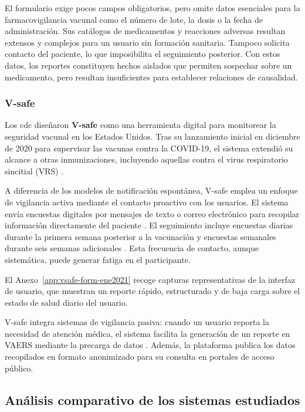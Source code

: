 El formulario exige pocos campos obligatorios, pero omite datos esenciales para la farmacovigilancia vacunal como el número de lote, la dosis o la fecha de administración. 
Sus catálogos de medicamentos y reacciones adversas resultan extensos y complejos para un usuario sin formación sanitaria. 
Tampoco solicita contacto del paciente, lo que imposibilita el seguimiento posterior. 
Con estos datos, los reportes constituyen hechos aislados que permiten sospechar sobre un medicamento, pero resultan insuficientes para establecer relaciones de causalidad.

\subsubsection{V-safe}

Los \gls{cdc} diseñaron \textbf{V-safe} como una herramienta digital para monitorear la seguridad vacunal en los Estados Unidos.
Tras su lanzamiento inicial en diciembre de 2020 para supervisar las vacunas contra la COVID-19, el sistema extendió su alcance a otras inmunizaciones, incluyendo aquellas contra el virus respiratorio sincitial (VRS) \cite{cdc_vsafe_portal}.

A diferencia de los modelos de notificación espontánea, V-safe emplea un enfoque de vigilancia activa mediante el contacto proactivo con los usuarios. 
El sistema envía encuestas digitales por mensajes de texto o correo electrónico para recopilar información directamente del paciente \cite{cdc_about_vsafe}.
El seguimiento incluye encuestas diarias durante la primera semana posterior a la vacunación y encuestas semanales durante seis semanas adicionales \cite{cdc_vsafe_portal,vsafe_monitoring_article}. 
Esta frecuencia de contacto, aunque sistemática, puede generar fatiga en el participante.

El Anexo~\ref{app:vsafe-form-ene2021} recoge capturas representativas de la interfaz de usuario, que muestran un reporte rápido, estructurado y de baja carga sobre el estado de salud diario del usuario.

V-safe integra sistemas de vigilancia pasiva: cuando un usuario reporta la necesidad de atención médica, el sistema facilita la generación de un reporte en VAERS mediante la precarga de datos \cite{cdc_about_vsafe}.
Además, la plataforma publica los datos recopilados en formato anonimizado para su consulta en portales de acceso público.

\subsection{Análisis comparativo de los sistemas estudiados}

